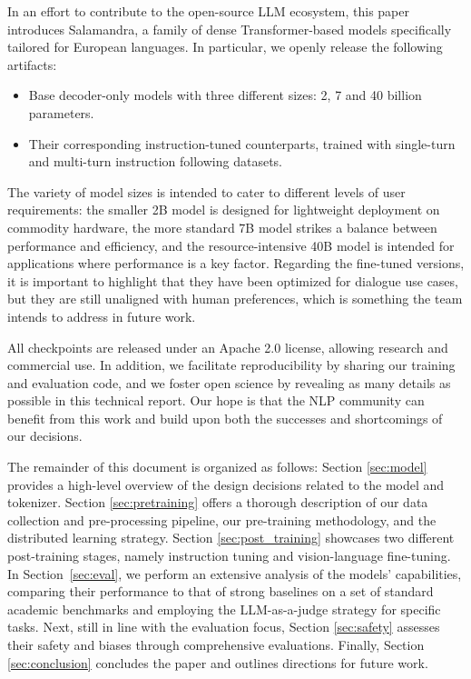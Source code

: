 In an effort to contribute to the open-source LLM ecosystem, this paper introduces \mbox{Salamandra}, a family of dense Transformer-based models specifically tailored for \mbox{European} languages. In particular, we openly release the following artifacts:
\begin{itemize}
\item Base decoder-only models with three different sizes: 2, 7 and 40 billion parameters.
\item Their corresponding instruction-tuned counterparts, trained with single-turn and multi-turn instruction following datasets.
\end{itemize}

The variety of model sizes is intended to cater to different levels of user requirements: the smaller 2B model is designed for lightweight deployment on commodity hardware, the more standard 7B model strikes a balance between performance and efficiency, and the resource-intensive 40B model is intended for applications where performance is a key factor. Regarding the fine-tuned versions, it is important to highlight that they have been optimized for dialogue use cases, but they are still unaligned with human preferences, which is something the team intends to address in future work.

All checkpoints are released under an Apache 2.0 license, allowing research and commercial use. In addition, we facilitate reproducibility by sharing our training and evaluation code, and we foster open science by revealing as many details as possible in this technical report. Our hope is that the NLP community can benefit from this work and build upon both the successes and shortcomings of our decisions.

The remainder of this document is organized as follows: Section \ref{sec:model} provides a high-level overview of the design decisions related to the model and tokenizer. Section \ref{sec:pretraining} offers a thorough description of our data collection and pre-processing pipeline, our pre-training methodology, and the distributed learning strategy. Section \ref{sec:post_training} showcases two different post-training stages, namely instruction tuning and vision-language fine-tuning. In \mbox{Section \ref{sec:eval},} we perform an extensive analysis of the models’ capabilities, comparing their performance to that of strong baselines on a set of standard academic benchmarks and employing the LLM-as-a-judge strategy for specific tasks. Next, still in line with the evaluation focus, Section \ref{sec:safety} assesses their safety and biases through comprehensive evaluations. Finally, Section \ref{sec:conclusion} concludes the paper and outlines directions for future work.